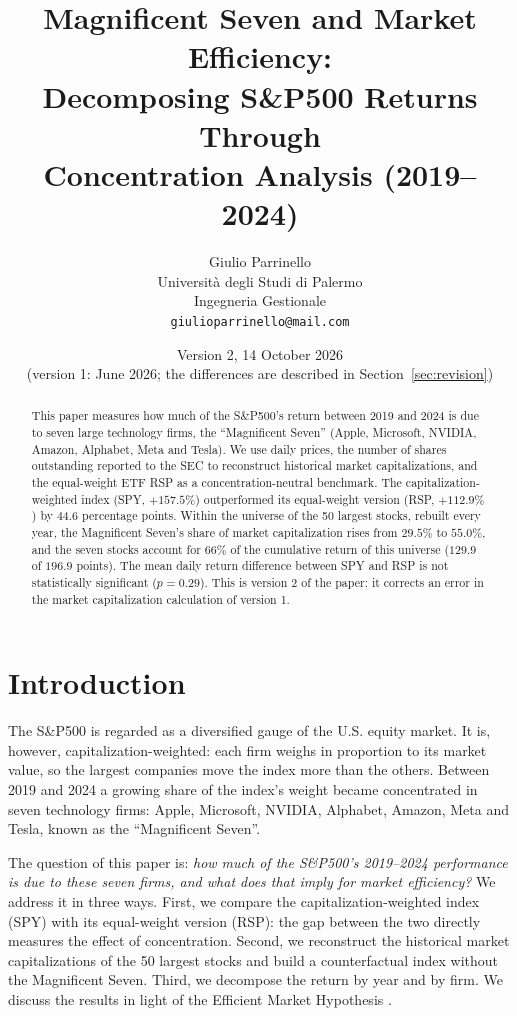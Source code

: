 \documentclass[12pt, a4paper]{article}
\title{Magnificent Seven and Market Efficiency:\\
Decomposing S\&P500 Returns Through\\
Concentration Analysis (2019--2024)}
\author{
  Giulio Parrinello\\
  \small Universit\`a degli Studi di Palermo\\
  \small Ingegneria Gestionale\\
  \small \texttt{giulioparrinello@mail.com}
}
\date{Version 2, 14 October 2026\\
\small (version 1: June 2026; the differences are described in Section~\ref{sec:revision})}
\begin{document}
\maketitle

\begin{abstract}
This paper measures how much of the S\&P500's return between 2019 and 2024 is due to seven large technology firms, the ``Magnificent Seven'' (Apple, Microsoft, NVIDIA, Amazon, Alphabet, Meta and Tesla). We use daily prices, the number of shares outstanding reported to the SEC to reconstruct historical market capitalizations, and the equal-weight ETF RSP as a concentration-neutral benchmark. The capitalization-weighted index (SPY, $+157.5\%$) outperformed its equal-weight version (RSP, $+112.9\%$) by $44.6$ percentage points. Within the universe of the 50 largest stocks, rebuilt every year, the Magnificent Seven's share of market capitalization rises from $29.5\%$ to $55.0\%$, and the seven stocks account for $66\%$ of the cumulative return of this universe ($129.9$ of $196.9$ points). The mean daily return difference between SPY and RSP is not statistically significant ($p = 0.29$). This is version 2 of the paper: it corrects an error in the market capitalization calculation of version 1.
\end{abstract}

\section{Introduction}

The S\&P500 is regarded as a diversified gauge of the U.S. equity market. It is, however, capitalization-weighted: each firm weighs in proportion to its market value, so the largest companies move the index more than the others. Between 2019 and 2024 a growing share of the index's weight became concentrated in seven technology firms: Apple, Microsoft, NVIDIA, Alphabet, Amazon, Meta and Tesla, known as the ``Magnificent Seven''.

The question of this paper is: \emph{how much of the S\&P500's 2019--2024 performance is due to these seven firms, and what does that imply for market efficiency?} We address it in three ways. First, we compare the capitalization-weighted index (SPY) with its equal-weight version (RSP): the gap between the two directly measures the effect of concentration. Second, we reconstruct the historical market capitalizations of the 50 largest stocks and build a counterfactual index without the Magnificent Seven. Third, we decompose the return by year and by firm. We discuss the results in light of the Efficient Market Hypothesis \citep{fama1970, fama1991}.
\end{document}
